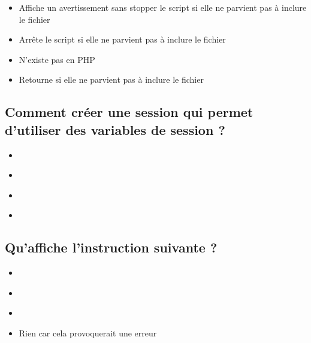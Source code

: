 \documentclass[11pt,a4paper]{article}
\begin{document}
\begin{itemize}
\item[\CaseCoche] Affiche un avertissement sans stopper le script si elle ne parvient pas à inclure le fichier \\
\item[\CaseCoche] Arrête le script si elle ne parvient pas à inclure le fichier \\
\item[\CaseCoche] N'existe pas en PHP \\
\item[\CaseCoche] Retourne  si elle ne parvient pas à inclure le fichier \\
\end{itemize}


\subsection{Comment créer une session qui permet d'utiliser des variables de session ?}

\begin{itemize}
\item[\CaseCoche]  \\
\item[\CaseCoche]  \\
\item[\CaseCoche]  \\
\item[\CaseCoche]  \\
\end{itemize}


\subsection{Qu'affiche l'instruction suivante ?}


\bigskip

\begin{itemize}
\item[\CaseCoche]  \\
\item[\CaseCoche]  \\
\item[\CaseCoche]  \\
\item[\CaseCoche] Rien car cela provoquerait une erreur \\
\end{itemize}
\end{document}
